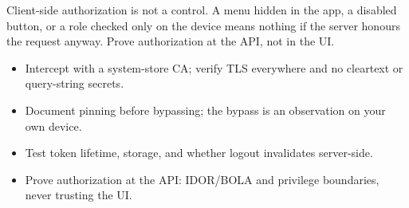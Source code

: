 \begin{trap}
Client-side authorization is not a control. A menu hidden in the app, a disabled button, or a role checked only on the device means nothing if the server honours the request anyway. Prove authorization at the API, not in the UI.
\end{trap}

\begin{summarybox}
\begin{itemize}
\item Intercept with a system-store CA; verify TLS everywhere and no cleartext or query-string secrets.
\item Document pinning before bypassing; the bypass is an observation on your own device.
\item Test token lifetime, storage, and whether logout invalidates server-side.
\item Prove authorization at the API: IDOR/BOLA and privilege boundaries, never trusting the UI.
\end{itemize}
\end{summarybox}
